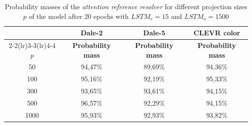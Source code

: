 \begin{table}[ht]
    \centering
    \begin{tabular}{c|c|c|c}
        \toprule
               & \multicolumn{1}{c}{\textbf{Dale-2}} & \multicolumn{1}{c}{\textbf{Dale-5}} & \multicolumn{1}{c}{\textbf{CLEVR color}} \\  \cmidrule(lr){2-2}\cmidrule(lr){3-3}\cmidrule(lr){4-4}
        $p$    & \textbf{Probability mass}           & \textbf{Probability mass}           & \textbf{Probability mass}                \\\midrule
        {50}   & {94,47\%}                           & {89,69\%}                           & {94,36\%}                                \\
        {100}  & {95,16\%}                           & {92,19\%}                           & {95,33\%}                                \\
        {300}  & {93,65\%}                           & {93,61\%}                           & {94,15\%}                                \\
        {500}  & {96,57\%}                           & {92,29\%}                           & {94,15\%}                                \\
        {1000} & {95,93\%}                           & {92,93\%}                           & {93,82\%}                                \\
        \bottomrule
    \end{tabular}
    \caption{Probability masses of the \emph{attention reference resolver} for different projection sizes $p$ of the model after 20 epochs with $LSTM_e=15$ and $LSTM_o=1500$}
    \label{tab:results:attention-reference-resolver}
\end{table}

